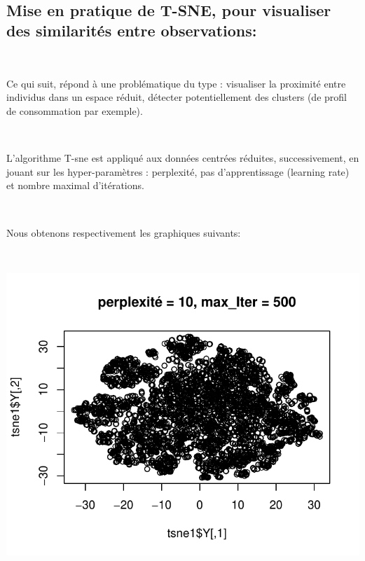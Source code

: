 \documentclass[]{imsart}
\numberwithin{equation}{section}
\theoremstyle{plain}
\begin{document}
~

\hypertarget{mise-en-pratique-de-t-sne-pour-visualiser-des-similarituxe9s-entre-observations}{%
\subsection{Mise en pratique de T-SNE, pour visualiser des similarités entre observations:}\label{mise-en-pratique-de-t-sne-pour-visualiser-des-similarituxe9s-entre-observations}}

~

Ce qui suit, répond à une problématique du type : visualiser la proximité entre individus dans un espace réduit, détecter potentiellement des clusters (de profil de consommation par exemple).

~

L'algorithme T-sne est appliqué aux données centrées réduites, successivement, en jouant sur les hyper-paramètres : perplexité, pas d'apprentissage (learning rate) et nombre maximal d'itérations.

~

Nous obtenons respectivement les graphiques suivants:

~

\begin{flushleft}\includegraphics{Analyse_Exploratoire_Projet_files/figure-latex/unnamed-chunk-20-1} \end{flushleft}
\end{document}
